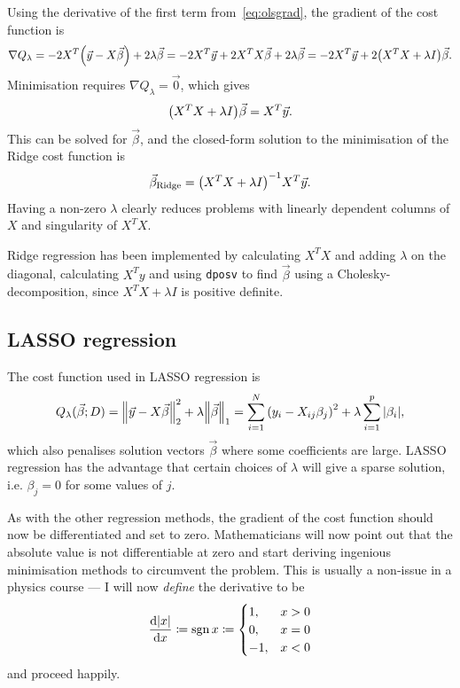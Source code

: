 \documentclass[11pt,british,a4paper]{article}
\DeclareMathOperator{\sgn}{sgn}
\numberwithin{equation}{section}
\begin{document}
Using the derivative of the first term from~\vref{eq:olsgrad}, the gradient of the cost function is
\begin{equation}
    \nabla Q_\lambda = -2 X^T \qty(\vec{y}-X\vec{\beta}) + 2\lambda \vec{\beta}
                     = -2 X^T \vec{y} + 2 X^T X \vec{\beta} + 2\lambda \vec{\beta}
                     = -2 X^T \vec{y} + 2\qty(X^T X + \lambda I)\vec{\beta}.
\end{equation}
Minimisation requires \(\nabla Q_\lambda = \vec{0}\), which gives
\begin{equation}
    \qty(X^T X + \lambda I)\vec{\beta} = X^T \vec{y}.
\end{equation}
This can be solved for \(\vec{\beta}\), and the closed-form solution to the minimisation of the Ridge cost function is
\begin{equation}
    \vec{\beta}_\text{Ridge} = \qty(X^T X + \lambda I)^{-1} X^T \vec{y}.
\end{equation}
Having a non-zero \(\lambda\) clearly reduces problems with linearly dependent columns of \(X\) and singularity of \(X^T X\).

Ridge regression has been implemented by calculating \(X^T X\) and adding \(\lambda\) on the diagonal, calculating \(X^T y\) and using \lstinline{dposv} to find \(\vec{\beta}\) using a Cholesky-decomposition, since \(X^T X + \lambda I\) is positive definite.

\subsection{LASSO regression}
The cost function used in LASSO regression is
\begin{equation}
    Q_\lambda(\vec{\beta};D) = \norm{\vec{y}-X\vec{\beta}}_2^2 + \lambda \norm{\vec{\beta}}_1
                             = \sum_{i=1}^N \qty(y_i - X_{ij}\beta_j)^2 + \lambda\sum_{i=1}^p \abs{\beta_i},
\end{equation}
which also penalises solution vectors \(\vec{\beta}\) where some coefficients are large.
LASSO regression has the advantage that certain choices of \(\lambda\) will give a sparse solution, i.e. \(\beta_j=0\) for some values of \(j\)\cite{wieringen}.

As with the other regression methods, the gradient of the cost function should now be differentiated and set to zero.
Mathematicians will now point out that the absolute value is not differentiable at zero and start deriving ingenious minimisation methods to circumvent the problem.
This is usually a non-issue in a physics course --- I will now \emph{define} the derivative to be
\begin{equation}
    \dv{\abs{x}}{x} \coloneqq \sgn{x} \coloneqq \begin{cases}1, & x > 0\\ 0, & x = 0 \\ -1, & x < 0 \end{cases}
\end{equation}
and proceed happily.
\end{document}
